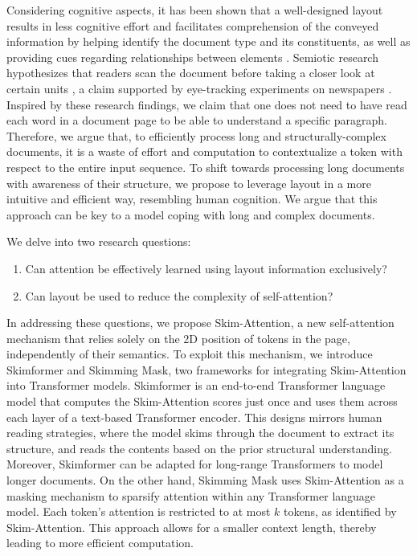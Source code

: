 Considering cognitive aspects, it has been shown that a well-designed layout results in less cognitive effort \citep{kieras1978beyond, britton1982effects, olive2017processing} and facilitates comprehension of the conveyed information by helping identify the document type and its constituents, as well as providing cues regarding relationships between elements \citep{meyer1980use, wright1999psychology}. Semiotic research hypothesizes that readers scan the document before taking a closer look at certain units \citep{kress1996reading}, a claim supported by eye-tracking experiments on newspapers \citep{leckner2012presentation}. Inspired by these research findings, we claim that one does not need to have read each word in a document page to be able to understand a specific paragraph. Therefore, we argue that, to efficiently process long and structurally-complex documents, it is a waste of effort and computation to contextualize a token with respect to the entire input sequence. To shift towards processing long documents with awareness of their structure, we propose to leverage layout in a more intuitive and efficient way, resembling human cognition. We argue that this approach can be key to a model coping with long and complex documents.

We delve into two research questions:

\begin{enumerate}
    \item Can attention be effectively learned using layout information exclusively?
    \item Can layout be used to reduce the complexity of self-attention?
\end{enumerate}

In addressing these questions, we propose Skim-Attention, a new self-attention mechanism that relies solely on the 2D position of tokens in the page, independently of their semantics. To exploit this mechanism, we introduce Skimformer and Skimming Mask, two frameworks for integrating Skim-Attention into Transformer models. Skimformer is an end-to-end Transformer language model that computes the Skim-Attention scores just once and uses them across each layer of a text-based Transformer encoder. This designs mirrors human reading strategies, where the model skims through the document to extract its structure, and reads the contents based on the prior structural understanding. Moreover, Skimformer can be adapted for long-range Transformers to model longer documents. On the other hand, Skimming Mask uses Skim-Attention as a masking mechanism to sparsify attention within any Transformer language model. Each token's attention is restricted to at most $k$ tokens, as identified by Skim-Attention. This approach allows for a smaller context length, thereby leading to more efficient computation.

